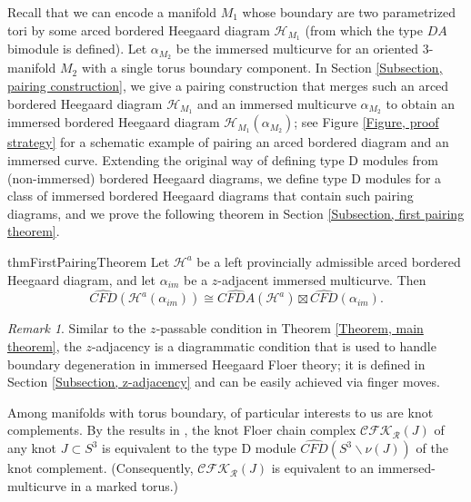 \documentclass{amsart}
\theoremstyle{definition}
\theoremstyle{remark}
\newtheorem{rmk}[thm]{Remark}
\numberwithin{equation}{section}
\numberwithin{equation}{section} \makeatletter
\begin{document}
Recall that we can encode a manifold $M_1$ whose boundary are two parametrized tori by some arced bordered Heegaard diagram $\mathcal{H}_{M_1}$ (from which the type $DA$ bimodule is defined). Let $\alpha_{M_2}$ be the immersed multicurve for an oriented 3-manifold $M_2$ with a single torus boundary component. In Section \ref{Subsection, pairing construction}, we give a pairing construction that merges such an arced bordered Heegaard diagram $\mathcal{H}_{M_1}$ and an immersed multicurve $\alpha_{M_2}$ to obtain an immersed bordered Heegaard diagram $\mathcal{H}_{M_1}(\alpha_{M_2})$; see Figure \ref{Figure, proof strategy} for a schematic example of pairing an arced bordered diagram and an immersed curve. Extending the original way of defining type D modules from (non-immersed) bordered Heegaard diagrams, we define type D modules for a class of immersed bordered Heegaard diagrams that contain such pairing diagrams, and we prove the following theorem in Section \ref{Subsection, first pairing theorem}. 
\begin{restatable}{thm}{FirstPairingTheorem}\label{Theorem, paring theorem via nice diagrams}
	Let $\mathcal{H}^a$ be a left provincially admissible arced bordered Heegaard diagram, and let $\alpha_{im}$ be a $z$-adjacent immersed multicurve. Then $$\widehat{CFD}(\mathcal{H}^a({\alpha_{im}}))\cong \widehat{CFDA}(\mathcal{H}^a)\boxtimes \widehat{CFD}(\alpha_{im}).$$
\end{restatable} 

\begin{rmk}
Similar to the $z$-passable condition in Theorem \ref{Theorem, main theorem}, the $z$-adjacency is a diagrammatic condition that is used to handle boundary degeneration in immersed Heegaard Floer theory; it is defined in Section \ref{Subsection, z-adjacency} and can be easily achieved via finger moves.  
\end{rmk}
Among manifolds with torus boundary, of particular interests to us are knot complements. By the results in \cite[Section 11.4-11.5]{LOT18}, the knot Floer chain complex  $\mathcal{CFK}_\mathcal{R}(J)$ of any knot $J\subset S^3$ is equivalent to the type D module $\widehat{CFD}(S^3\backslash \nu(J))$ of the knot complement. (Consequently, $\mathcal{CFK}_\mathcal{R}(J)$ is equivalent to an immersed-multicurve in a marked torus.)
\end{document}
